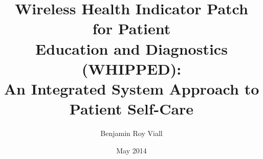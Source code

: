 \documentclass[oneside]{book}
\begin{document}
\title{Wireless Health Indicator Patch  for Patient \protect\\ Education and Diagnostics (WHIPPED): \protect\\ An Integrated System Approach to Patient Self-Care}
\author{Benjamin Roy Viall}
\date{May 2014} %










\frontmatter


\maketitle




%
\end{document}
